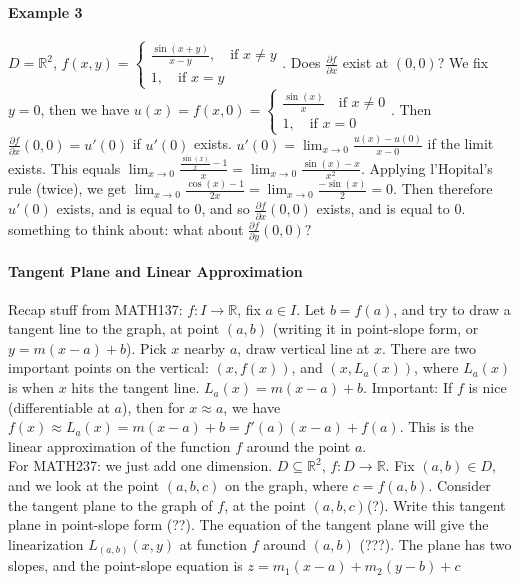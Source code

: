 \documentclass[10pt,letter]{article}
\theoremstyle{plain}
\theoremstyle{definition}
\begin{document}
\paragraph{Example 3}
$D=\mathbb{R}^2$, $f(x,y)=\begin{cases}\frac{\sin(x+y)}{x-y},\quad\text{if }x\neq y\\1,\quad\text{if }x=y\end{cases}$. Does $\frac{\partial f}{\partial x}$ exist at $(0,0)$? We fix $y=0$, then we have $u(x)=f(x,0)=\begin{cases}\frac{\sin(x)}{x}\quad\text{if }x\neq0\\1,\quad\text{if }x=0\end{cases}$. Then $\frac{\partial f}{\partial x}(0,0)=u'(0)$ if $u'(0)$ exists. $u'(0)=\lim_{x\rightarrow0}\frac{u(x)-u(0)}{x-0}$ if the limit exists. This equals $\lim_{x\rightarrow 0}\frac{\frac{\sin(x)}{x}-1}{x}=\lim_{x\rightarrow0}\frac{\sin(x)-x}{x^2}$. Applying l'Hopital's rule (twice), we get $\lim_{x\rightarrow0}\frac{\cos(x)-1}{2x}=\lim_{x\rightarrow0}\frac{-\sin(x)}{2}=0$. Then therefore $u'(0)$ exists, and is equal to $0$, and so $\frac{\partial f}{\partial x}(0,0)$ exists, and is equal to $0$. something to think about: what about $\frac{\partial f}{\partial y}(0,0)?$ 

\paragraph{Tangent Plane and Linear Approximation}
Recap stuff from MATH137: $f:I\rightarrow\mathbb{R}$, fix $a\in I$. Let $b=f(a)$, and try to draw a tangent line to the graph, at point $(a,b)$ (writing it in point-slope form, or $y=m(x-a)+b$). Pick $x$ nearby $a$, draw vertical line at $x$. There are two important points on the vertical: $(x,f(x))$, and $(x,L_a(x))$, where $L_a(x)$ is when $x$ hits the tangent line. $L_a(x)=m(x-a)+b$. Important: If $f$ is nice (differentiable at $a$), then for $x\approx a$, we have $f(x)\approx L_a(x)=m(x-a)+b=f'(a)(x-a)+f(a)$. This is the linear approximation of the function $f$ around the point $a$. \\ 
For MATH237: we just add one dimension. $D\subseteq\mathbb{R}^2$, $f:D\rightarrow\mathbb{R}$. Fix $(a,b)\in D$, and we look at the point $(a,b,c)$ on the graph, where $c=f(a,b)$. Consider the tangent plane to the graph of $f$, at the point $(a,b,c)$(?). Write this tangent plane in point-slope form (??). The equation of the tangent plane will give the linearization $L_{(a,b)}(x,y)$ at function $f$ around $(a,b)$ (???). The plane has two slopes, and the point-slope equation is $z=m_1(x-a)+m_2(y-b)+c$ 
\end{document}

